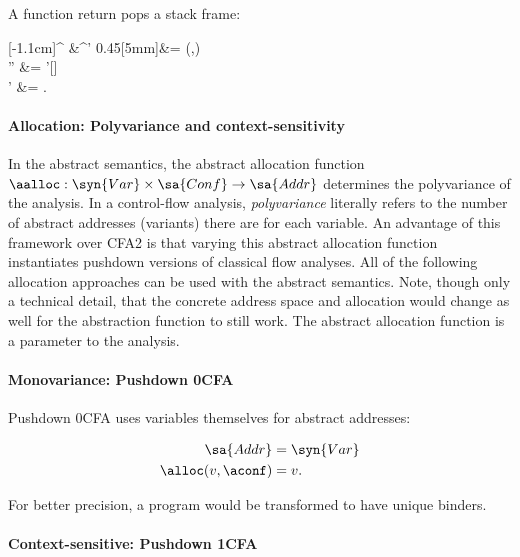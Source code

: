 \noindent
A function return pops a stack frame:
\begin{center}
  [-1.1cm]{^{\aconf} &\aTo {}^{\aconf'} }
  {0.45}[5mm]{\aaddr &= \aalloc(\vv,\aconf)
    \\
    \aenv'' &= \aenv'[\vv \mapsto \aaddr]
    \\
    \astore' &= \astore \join [\aaddr \mapsto
    \aArgEval(\aexpr,\aenv,\astore)] \text.}
\end{center}
\paragraph{Allocation: Polyvariance and context-sensitivity}
\label{sec:polyvariance}
In the abstract semantics, the abstract allocation function
$\aalloc : \syn{Var} \times \sa{Conf} \to \sa{Addr}$ determines the
polyvariance of the analysis.
In a control-flow analysis, \emph{polyvariance} literally refers to
the number of abstract addresses (variants) there are for each
variable.
An advantage of this framework over CFA2 is
that varying this abstract allocation function
instantiates pushdown versions of classical flow analyses.
All of the following allocation approaches can be used with the
abstract semantics. Note, though only a technical detail, that the concrete address space and allocation would change as well for the abstraction function to still work.
The abstract allocation function is a
parameter to the analysis.

\paragraph{Monovariance: Pushdown 0CFA}

Pushdown 0CFA uses variables themselves for abstract addresses:

\begin{align*}
\sa{Addr} &= \syn{Var}
\\
  \alloc(v,\aconf) &= v
  \text.
  \end{align*}

For better precision, a program would be transformed to have unique binders.

  \paragraph{Context-sensitive: Pushdown 1CFA}

